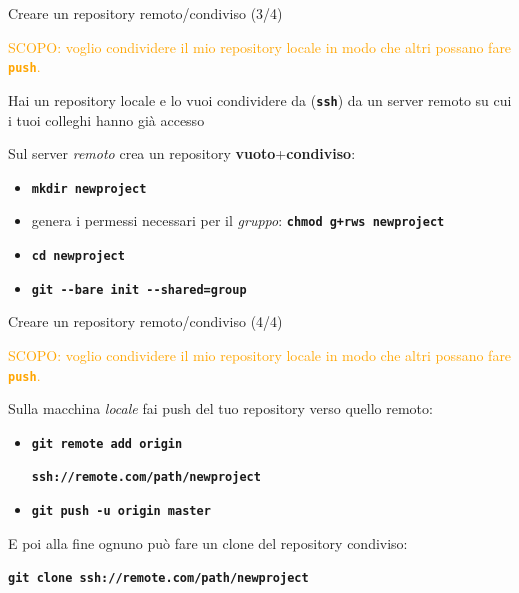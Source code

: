 \documentclass{beamer}
\begin{document}
\begin{frame}{\centerline{Creare un repository remoto/condiviso (3/4)}}
  \begin{center}
    \textcolor{orange}{SCOPO: voglio condividere il mio repository locale in modo che altri possano fare \texttt{\textbf{push}}.}
  \end{center}

  Hai un repository locale e lo vuoi condividere da 
  (\texttt{\textbf{ssh}}) da un server remoto su cui i tuoi colleghi hanno gi\`{a} accesso
  \begin{block}{Sul server \emph{remoto} crea un repository 
      \textbf{vuoto}+\textbf{condiviso}:}
    \begin{itemize}
    \item \texttt{\textbf{mkdir newproject}}
    \item genera i permessi necessari per il \emph{gruppo}: \texttt{\textbf{chmod g+rws newproject}}
    \item \texttt{\textbf{cd newproject}}
    \item \texttt{\textbf{git \alert{-{}-bare} init \alert{-{}-shared=group}}}
    \end{itemize}
  \end{block}

\end{frame}

\begin{frame}{\centerline{Creare un repository remoto/condiviso (4/4)}}
  \begin{center}
    \textcolor{orange}{SCOPO: voglio condividere il mio repository locale in modo che altri possano fare \texttt{\textbf{push}}.}
  \end{center}

  \begin{block}{Sulla macchina \emph{locale} fai push del tuo repository verso quello remoto:}
    \begin{itemize}
    \item \texttt{\textbf{git remote add origin }}
          \begin{center}
            \texttt{\textbf{ssh://remote.com/path/newproject}}
      \end{center}
    \item \texttt{\textbf{git push \alert{-u} origin master}}
    \end{itemize}
  \end{block}
  E poi alla fine ognuno pu\`{o} fare un clone del repository condiviso:
  \begin{center}
    \texttt{\textbf{git clone ssh://remote.com/path/newproject}}
  \end{center}
\end{frame}
\end{document}
